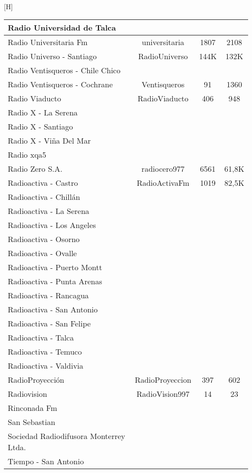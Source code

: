 \begin{center}[H]
\begin{longtable}{| l | c | c | c |}
Radio Universidad de Talca	&		&		&		\\ \hline
Radio Universitaria Fm	&	universitaria	&	1807	&	2108	\\ \hline
Radio Universo - Santiago	&	RadioUniverso	&	144K	&	132K	\\ \hline
Radio Ventisqueros - Chile Chico	&		&		&		\\ \hline
Radio Ventisqueros - Cochrane	&	Ventisqueros	&	91	&	1360	\\ \hline
Radio Viaducto	&	RadioViaducto	&	406	&	948	\\ \hline
Radio X - La Serena	&		&		&		\\ \hline
Radio X - Santiago	&		&		&		\\ \hline
Radio X - Viña Del Mar	&		&		&		\\ \hline
Radio xqa5	&		&		&		\\ \hline
Radio Zero S.A.	&	radiocero977	&	6561	&	61,8K	\\ \hline
Radioactiva - Castro	&	RadioActivaFm	&	1019	&	82,5K	\\ \hline
Radioactiva - Chillán	&		&		&		\\ \hline
Radioactiva - La Serena	&		&		&		\\ \hline
Radioactiva - Los Angeles	&		&		&		\\ \hline
Radioactiva - Osorno	&		&		&		\\ \hline
Radioactiva - Ovalle	&		&		&		\\ \hline
Radioactiva - Puerto Montt	&		&		&		\\ \hline
Radioactiva - Punta Arenas	&		&		&		\\ \hline
Radioactiva - Rancagua	&		&		&		\\ \hline
Radioactiva - San Antonio	&		&		&		\\ \hline
Radioactiva - San Felipe	&		&		&		\\ \hline
Radioactiva - Talca	&		&		&		\\ \hline
Radioactiva - Temuco	&		&		&		\\ \hline
Radioactiva - Valdivia	&		&		&		\\ \hline
RadioProyección	&	RadioProyeccion	&	397	&	602	\\ \hline
Radiovision	&	RadioVision997	&	14	&	23	\\ \hline
Rinconada Fm	&		&		&		\\ \hline
San Sebastian	&		&		&		\\ \hline
Sociedad Radiodifusora Monterrey Ltda.	&		&		&		\\ \hline
Tiempo - San Antonio	&		&		&		\\ \hline

\end{longtable}
\end{center}

